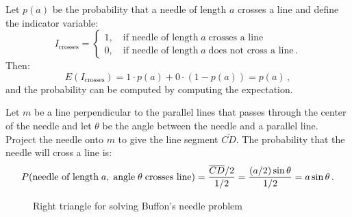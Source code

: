 
Let $p(a)$ be the probability that a needle of length $a$ crosses a line and define the indicator variable:
\[
I_{\textrm{crosses}}=
\left\{
\begin{array}{ll}
1,\quad \textrm{if needle of length}\;a\;\textrm{crosses a line}\\
0, \quad \textrm{if needle of length}\;a\;\textrm{does not cross a line}\,.
\end{array}
\right.
\]
Then:
\begin{equation}\label{eq.buffon-probability}
E(I_{\textrm{crosses}})=1\cdot p(a) + 0\cdot (1-p(a))=p(a)\,,
\end{equation}
and the probability can be computed by computing the expectation.

Let $m$ be a line perpendicular to the parallel lines that passes through the center of the needle and let $\theta$ be the angle between the needle and a parallel line. Project the needle onto $m$ to give the line segment $\overline{CD}$. The probability that the needle will cross a line is:
\begin{equation}\label{eq.cross}
P(\textrm{needle of length}\;a,\;\textrm{angle}\;\theta\;\textrm{crosses line})=\displaystyle\frac{\overline{CD}/2}{1/2}=\displaystyle\frac{(a/2)\sin \theta}{1/2}=a\sin\theta\,.
\end{equation}

\begin{figure}[bt]
\begin{center}
\end{center}
\caption{Right triangle for solving Buffon's needle problem}\label{f.buffon2}
\end{figure}

